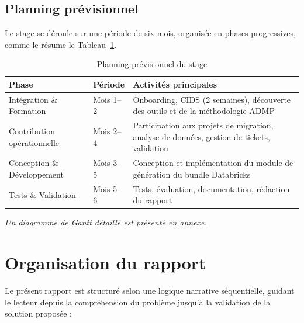 \subsection{Planning prévisionnel}
\label{subsec:planning}

Le stage se déroule sur une période de six mois, organisée en phases progressives, comme le résume le Tableau~\ref{tab:planning}.

\begin{table}[h!]
\centering
\caption{Planning prévisionnel du stage}
\label{tab:planning}
\begin{tabularx}{\textwidth}{l l X}
\toprule
\textbf{Phase} & \textbf{Période} & \textbf{Activités principales} \\
\midrule
Intégration \& Formation & Mois 1--2 & Onboarding, CIDS (2 semaines), découverte des outils et de la méthodologie ADMP \\
\addlinespace
Contribution opérationnelle & Mois 2--4 & Participation aux projets de migration, analyse de données, gestion de tickets, validation \\
\addlinespace
Conception \& Développement & Mois 3--5 & Conception et implémentation du module de génération du bundle Databricks \\
\addlinespace
Tests \& Validation & Mois 5--6 & Tests, évaluation, documentation, rédaction du rapport \\
\bottomrule
\end{tabularx}
\end{table}

\textit{Un diagramme de Gantt détaillé est présenté en annexe.}

\section{Organisation du rapport}
\label{sec:organisation}

Le présent rapport est structuré selon une logique narrative séquentielle, guidant le lecteur depuis la compréhension du problème jusqu'à la validation de la solution proposée :

